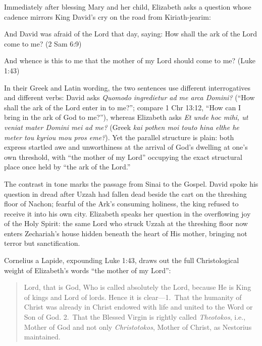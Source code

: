 Immediately after blessing Mary and her child, Elizabeth asks a question whose cadence mirrors King David's cry on the road from Kiriath-jearim:

\begin{scriptureblock}
And David was afraid of the Lord that day, saying: How shall the ark of the Lord come to me? \textnormal{(2 Sam 6:9)}
\end{scriptureblock}

\begin{scriptureblock}
And whence is this to me that the mother of my Lord should come to me? \textnormal{(Luke 1:43)}
\end{scriptureblock}

In their Greek and Latin wording, the two sentences use different interrogatives and different verbs: David asks \textit{Quomodo ingredietur ad me arca Domini?} (``How shall the ark of the Lord enter in to me?''; compare 1 Chr 13:12, ``How can I bring in the ark of God to me?''), whereas Elizabeth asks \textit{Et unde hoc mihi, ut veniat mater Domini mei ad me?} (Greek \textit{kai pothen moi touto hina elthe he meter tou kyriou mou pros eme?}). Yet the parallel structure is plain: both express startled awe and unworthiness at the arrival of God's dwelling at one's own threshold, with ``the mother of my Lord'' occupying the exact structural place once held by ``the ark of the Lord.''

The contrast in tone marks the passage from Sinai to the Gospel. David spoke his question in dread after Uzzah had fallen dead beside the cart on the threshing floor of Nachon; fearful of the Ark's consuming holiness, the king refused to receive it into his own city. Elizabeth speaks her question in the overflowing joy of the Holy Spirit: the same Lord who struck Uzzah at the threshing floor now enters Zechariah's house hidden beneath the heart of His mother, bringing not terror but sanctification.

Cornelius a Lapide, expounding Luke 1:43, draws out the full Christological weight of Elizabeth's words ``the mother of my Lord'':

\begin{quote}\small
Lord, that is God, Who is called absolutely the Lord, because He is King of kings and Lord of lords. Hence it is clear---1.\ That the humanity of Christ was already in Christ endowed with life and united to the Word or Son of God. 2.\ That the Blessed Virgin is rightly called \textit{Theotokos}, i.e., Mother of God and not only \textit{Christotokos}, Mother of Christ, as Nestorius maintained.
\end{quote}

